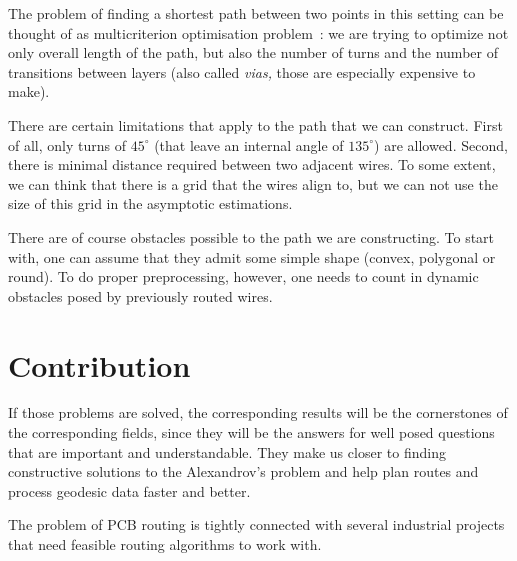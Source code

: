 \documentclass[a4paper,11pt]{article}
\begin{document}
The problem of finding a shortest path between two points in this setting can be thought of as multicriterion optimisation problem~\cite{handbook}: we are trying to optimize not only overall length of the path, but also the number of turns and the number of transitions between layers (also called {\it vias,} those are especially expensive to make).

There are certain limitations that apply to the path that we can construct. First of all, only turns of $45^\circ$ (that leave an internal angle of $135^\circ$) are allowed. Second, there is minimal distance required between two adjacent wires. To some extent, we can think that there is a grid that the wires align to, but we can not use the size of this grid in the asymptotic estimations.

There are of course obstacles possible to the path we are constructing. To start with, one can assume that they admit some simple shape (convex, polygonal or round). To do proper preprocessing, however, one needs to count in dynamic obstacles posed by previously routed wires.

\section{Contribution}

If those problems are solved, the corresponding results will be the cornerstones of the corresponding fields, since they will be the answers for well posed questions that are important and understandable. They make us closer to finding constructive solutions to the Alexandrov's problem and help plan routes and process geodesic data faster and better.

The problem of PCB routing is tightly connected with several industrial projects that need feasible routing algorithms to work with.

{}

\end{document}
